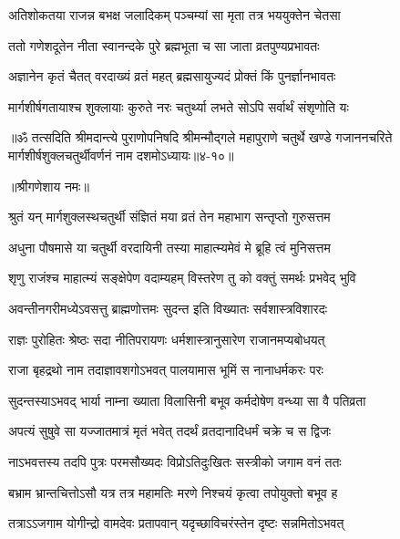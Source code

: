 \twolineshloka
{अतिशोकतया राजन्न बभक्ष जलादिकम्}
{पञ्चम्यां सा मृता तत्र भययुक्तेन चेतसा} %

\twolineshloka
{ततो गणेशदूतेन नीता स्वानन्दके पुरे}
{ब्रह्मभूता च सा जाता व्रतपुण्यप्रभावतः} %

\twolineshloka
{अज्ञानेन कृतं चैतत् वरदाख्यं व्रतं महत्}
{ब्रह्मसायुज्यदं प्रोक्तं किं पुनर्ज्ञानभावतः} %

\twolineshloka
{मार्गशीर्षगतायाश्च शुक्लायाः कुरुते नरः}
{चतुर्थ्या लभते सोऽपि सर्वार्थं संश‍ृणोति यः} %

॥ॐ तत्सदिति श्रीमदान्त्ये पुराणोपनिषदि श्रीमन्मौद्गले महापुराणे चतुर्थे खण्डे गजाननचरिते मार्गशीर्षशुक्लचतुर्थीवर्णनं नाम दशमोऽध्यायः॥४-१०॥


\label{sec:pausha-shukla-chaturthi-mahatmya-varnanam}

\centerline{॥श्रीगणेशाय नमः॥}


\twolineshloka
{श्रुतं यन् मार्गशुक्लस्थचतुर्थी संज्ञितं मया}
{व्रतं तेन महाभाग सन्तृप्तो गुरुसत्तम} %

\twolineshloka
{अधुना पौषमासे या चतुर्थी वरदायिनी}
{तस्या माहात्म्यमेवं मे ब्रूहि त्वं मुनिसत्तम} %


\twolineshloka
{श‍ृणु राजंश्च माहात्म्यं सङ्क्षेपेण वदाम्यहम्}
{विस्तरेण तु को वक्तुं समर्थः प्रभवेद् भुवि} %

\twolineshloka
{अवन्तीनगरीमध्येऽवसत्तु ब्राह्मणोत्तमः}
{सुदन्त इति विख्यातः सर्वशास्त्रविशारदः} %

\twolineshloka
{राज्ञः पुरोहितः श्रेष्ठः सदा नीतिपरायणः}
{धर्मशास्त्रानुसारेण राजानमप्यबोधयत्} %

\twolineshloka
{राजा बृहद्रथो नाम तदाज्ञावशगोऽभवत्}
{पालयामास भूमिं स नानाधर्मकरः परः} %

\twolineshloka
{सुदन्तस्याऽभवद् भार्या नाम्ना ख्याता विलासिनी}
{बभूव कर्मदोषेण वन्ध्या सा वै पतिव्रता} %

\twolineshloka
{अपत्यं सुषुवे सा यज्जातमात्रं मृतं भवेत्}
{तदर्थं व्रतदानादिधर्मं चक्रे च स द्विजः} %

\twolineshloka
{नाऽभवत्तस्य तदपि पुत्रः परमसौख्यदः}
{विप्रोऽतिदुःखितः सस्त्रीको जगाम वनं ततः} %

\twolineshloka
{बभ्राम भ्रान्तचित्तोऽसौ यत्र तत्र महामतिः}
{मरणे निश्चयं कृत्वा तपोयुक्तो बभूव ह} %

\twolineshloka
{तत्राऽऽजगाम योगीन्द्रो वामदेवः प्रतापवान्}
{यदृच्छाविचरंस्तेन दृष्टः सन्नमितोऽभवत्} %

